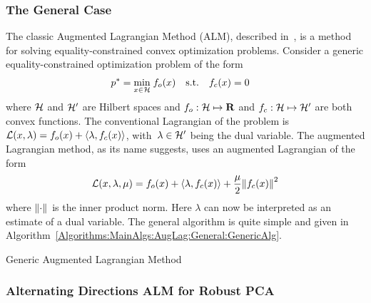 \subsubsection{The General Case}
\label{Algorithms:MainAlgs:AugLag:General:Subsubsec}

The classic Augmented Lagrangian Method (ALM), described in~\cite{Bertsekas:1996fk}, is a method for solving equality-constrained convex optimization problems. Consider a generic equality-constrained optimization problem of the form
%
\begin{align}
p^* = \min_{x\in{\mathcal{H}}} \;&f_o(x) \quad \text{s.t.} \quad f_c(x) =0
\label{Algorithms:MainAlgs:AugLag:General:GenericProb}
\end{align}
%
where ${\mathcal{H}}$ and ${\mathcal{H}}'$ are Hilbert spaces and $f_o:{\mathcal{H}} \mapsto {\mathbf R}$ and $f_c:{\mathcal{H}} \mapsto {\mathcal{H}}'$ are both convex functions. The conventional Lagrangian of the problem is ${\mathcal{L}}(x,\lambda) = f_o(x) + \langle \lambda, f_c(x) \rangle$, with~$\lambda\in{\mathcal{H}}'$ being the dual variable. The augmented Lagrangian method, as its name suggests, uses an augmented Lagrangian of the form 
%
\begin{align}
{\mathcal{L}}(x,\lambda,\mu) = f_o(x) + \langle \lambda, f_c(x) \rangle + \frac{\mu}{2} {\left\|f_c(x)\right\|}_{}^{2}
\label{Algorithms:MainAlgs:AugLag:General:GenAugLagr}
\end{align}
%
where ${\left\|\cdot\right\|}_{}^{}$ is the inner product norm. Here $\lambda$ can now be interpreted as an estimate of a dual variable. The general algorithm is quite simple and given in Algorithm~\ref{Algorithms:MainAlgs:AugLag:General:GenericAlg}.
%
\begin{algorithm}
\caption{Generic Augmented Lagrangian Method}
\label{Algorithms:MainAlgs:AugLag:General:GenericAlg}
\end{algorithm}


\subsubsection{Alternating Directions ALM for Robust PCA}
\label{Algorithms:MainAlgs:AugLag:RPCA:Subsubsec}


